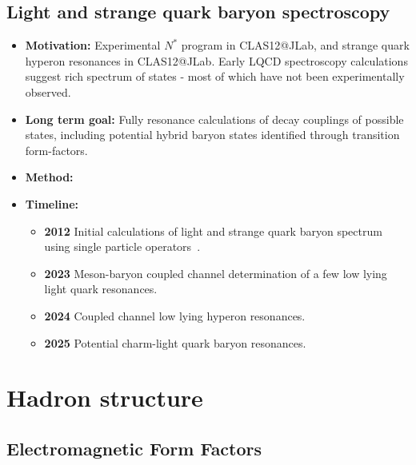 \documentclass[12pt,hyperpdf]{article}
\begin{document}
\subsection{Light and strange quark baryon spectroscopy}
\begin{itemize}
    \item{\bf Motivation:} Experimental $N^\ast$ program in CLAS12@JLab,
      and strange quark hyperon resonances in CLAS12@JLab. Early LQCD
      spectroscopy calculations suggest rich spectrum of states - most
      of which have not been experimentally observed.
    \item{\bf Long term goal:} Fully resonance calculations of decay
      couplings of possible states, including potential hybrid baryon
      states identified through transition form-factors.
    \item{\bf Method:} 
  \item{\bf Timeline:}
\begin{itemize}
    \item{\bf 2012} Initial calculations of light and strange quark baryon
      spectrum using single particle operators~\cite{Edwards:2011jj,Dudek:2012ag,Edwards:2012fx}.
    \item{\bf 2023} Meson-baryon coupled channel determination of a few
      low lying light quark resonances.
    \item{\bf 2024} Coupled channel low lying hyperon resonances.
    \item{\bf 2025} Potential charm-light quark baryon resonances.
\end{itemize}
\end{itemize}





\section{Hadron structure}\label{sec:hadstruct}

\subsection{Electromagnetic Form Factors}\label{sec:vecff}

\end{document}
